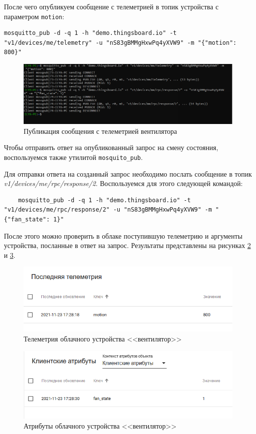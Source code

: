 \documentclass[a4paper,14pt]{extarticle}
\begin{document}
После чего опубликуем сообщение с телеметрией в топик устройства с параметром
\texttt{motion}:

\begin{lstlisting}
mosquitto_pub -d -q 1 -h "demo.thingsboard.io" -t "v1/devices/me/telemetry" -u "nS83gBMMgHxwPq4yXVW9" -m "{"motion": 800}"
\end{lstlisting}

\begin{figure}[h!]
	\centering
	\includegraphics[width=0.6\linewidth]{images/t1-sender}
	\caption{Публикация сообщения с телеметрией вентилятора}
	\label{fig:t1-sender}
\end{figure}

Чтобы отправить ответ на опубликованный запрос на смену состояния, воспользуемся
также утилитой \texttt{mosquito\_pub}.

Для отправки ответа на созданный запрос необходимо послать сообщение в топик
\textit{v1/devices/me/rpc/response/2}. Воспользуемся для этого следующей командой:

\begin{lstlisting}
	mosquitto_pub -d -q 1 -h "demo.thingsboard.io" -t "v1/devices/me/rpc/response/2" -u "nS83gBMMgHxwPq4yXVW9" -m "{"fan_state": 1}"
\end{lstlisting}

После этого можно проверить в облаке поступившую телеметрию и аргументы устройства,
посланные в ответ на запрос. Результаты представлены на рисунках \ref{fig:tel} и \ref{fig:attr}.

\begin{figure}[h!]
	\centering
	\includegraphics[width=0.6\linewidth]{images/tel}
	\caption{Телеметрия облачного устройства <<вентилятор>>}
	\label{fig:tel}
\end{figure}


\begin{figure}[h!]
	\centering
	\includegraphics[width=0.6\linewidth]{images/attr}
	\caption{Атрибуты облачного устройства <<вентилятор>>}
	\label{fig:attr}
\end{figure}
\end{document}
